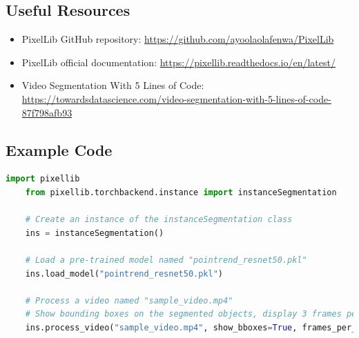 \subsection*{Useful Resources}
\begin{itemize}[label=--]
    \item PixelLib GitHub repository: \url{https://github.com/ayoolaolafenwa/PixelLib}
    \item PixelLib official documentation: \url{https://pixellib.readthedocs.io/en/latest/}
    \item Video Segmentation With 5 Lines of Code: \url{https://towardsdatascience.com/video-segmentation-with-5-lines-of-code-87f798afb93}
\end{itemize}

\subsection{Example Code}	
\begin{lstlisting}[language=Python]
    import pixellib
    from pixellib.torchbackend.instance import instanceSegmentation
    
    # Create an instance of the instanceSegmentation class
    ins = instanceSegmentation()
    
    # Load a pre-trained model named "pointrend_resnet50.pkl"
    ins.load_model("pointrend_resnet50.pkl")
    
    # Process a video named "sample_video.mp4"
    # Show bounding boxes on the segmented objects, display 3 frames per second, and save the output as "output_video.mp4"
    ins.process_video("sample_video.mp4", show_bboxes=True, frames_per_second=3, output_video_name="output_video.mp4")
    
\end{lstlisting}


